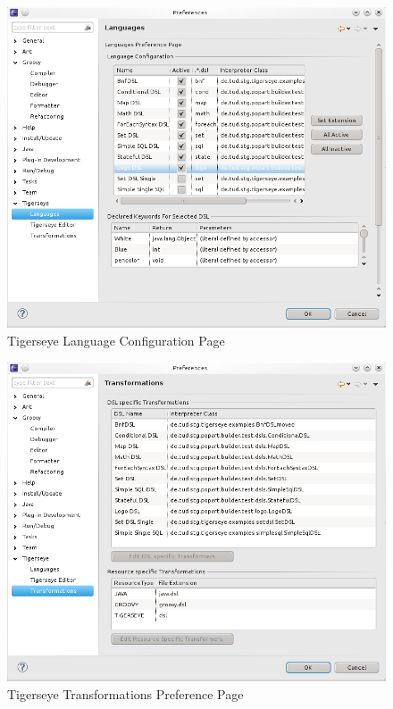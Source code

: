 \documentclass[article,colorback,accentcolor=tud4c]{tudreport}
\begin{document}
	\begin{figure}
	  \centering
	  \includegraphics[scale=.5,keepaspectratio=true]{./pics/preferences_languages.png}
	  \caption{Tigerseye Language Configuration Page}
	  \label{fig:prefs_languages}
	\end{figure}


	\begin{figure}
 \centering
 \includegraphics[scale=.5,keepaspectratio=true]{./pics/preferences_transformations.png}
 \caption{Tigerseye Transformations Preference Page}
 \label{fig:prefs_transformations}
\end{figure}
\end{document}
